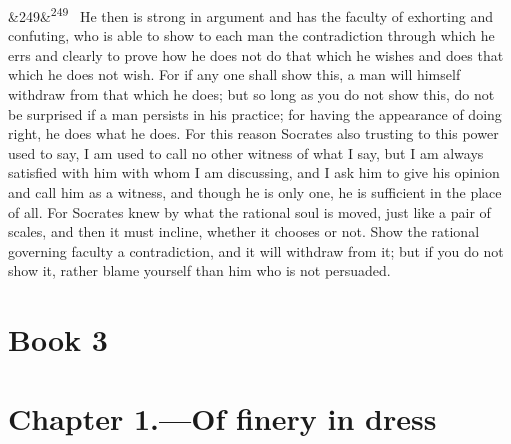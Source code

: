 \documentclass[12pt]{article}
\newcommand{\para}[1][]{\par\noindent\ifx&#1&\else\textsuperscript{\footnotesize #1}~\fi}
\begin{document}
\para[249] He then is strong in argument and has the faculty of exhorting and confuting, who is able to show to each man the contradiction through which he errs and clearly to prove how he does not do that which he wishes and does that which he does not wish. For if any one shall show this, a man will himself withdraw from that which he does; but so long as you do not show this, do not be surprised if a man persists in his practice; for having the appearance of doing right, he does what he does. For this reason Socrates also trusting to this power used to say, I am used to call no other witness of what I say, but I am always satisfied with him with whom I am discussing, and I ask him to give his opinion and call him as a witness, and though he is only one, he is sufficient in the place of all. For Socrates knew by what the rational soul is moved, just like a pair of scales, and then it must incline, whether it chooses or not. Show the rational governing faculty a contradiction, and it will withdraw from it; but if you do not show it, rather blame yourself than him who is not persuaded.

\section*{Book 3}

\section*{Chapter 1.---Of finery in dress}
\end{document}
